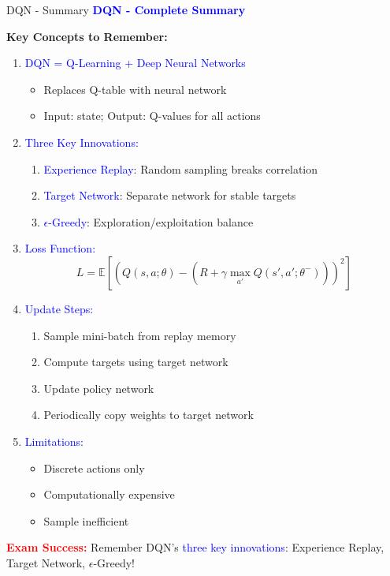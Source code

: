 \documentclass[8pt]{beamer}
\begin{document}
	\begin{frame}{DQN - Summary}
		\fontsize{6.5}{7.5}\selectfont
		\textcolor{blue}{\textbf{DQN - Complete Summary}}
		
		\textbf{Key Concepts to Remember:}
		
		\begin{enumerate}
			\item \textcolor{blue}{DQN = Q-Learning + Deep Neural Networks}
			\begin{itemize}
				\item Replaces Q-table with neural network
				\item Input: state; Output: Q-values for all actions
			\end{itemize}
			
			\item \textcolor{blue}{Three Key Innovations:}
			\begin{enumerate}
				\item \textcolor{blue}{Experience Replay}: Random sampling breaks correlation
				\item \textcolor{blue}{Target Network}: Separate network for stable targets
				\item \textcolor{blue}{$\epsilon$-Greedy}: Exploration/exploitation balance
			\end{enumerate}
			
			\item \textcolor{blue}{Loss Function:}
			\[
			L = \mathbb{E}[(Q(s,a;\theta) - (R + \gamma \max_{a'} Q(s',a';\theta^-)))^2]
			\]
			
			\item \textcolor{blue}{Update Steps:}
			\begin{enumerate}
				\item Sample mini-batch from replay memory
				\item Compute targets using target network
				\item Update policy network
				\item Periodically copy weights to target network
			\end{enumerate}
			
			\item \textcolor{blue}{Limitations:}
			\begin{itemize}
				\item Discrete actions only
				\item Computationally expensive
				\item Sample inefficient
			\end{itemize}
		\end{enumerate}
		
		\textcolor{red}{\textbf{Exam Success:}} Remember DQN's \textcolor{blue}{three key innovations}: Experience Replay, Target Network, $\epsilon$-Greedy!
	\end{frame}
	
\end{document}
